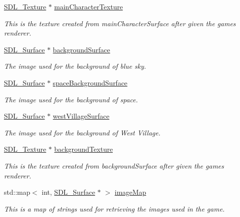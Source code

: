 \begin{DoxyCompactItemize}
\mbox{\hyperlink{_s_d_l__render_8h_a17850d7f1f5de457727cb3cf66b3a7f5}{S\+D\+L\+\_\+\+Texture}} $\ast$ \mbox{\hyperlink{class_resource_manager_a671fa64fc93e8fad27e25fdcfddbc982}{main\+Character\+Texture}}
\begin{DoxyCompactList}\small\item\em This is the texture created from main\+Character\+Surface after given the game\textquotesingle{}s renderer. \end{DoxyCompactList}\item 
\mbox{\hyperlink{struct_s_d_l___surface}{S\+D\+L\+\_\+\+Surface}} $\ast$ \mbox{\hyperlink{class_resource_manager_a824fd3c239a6ecca4b1cf770c73c1d3a}{background\+Surface}}
\begin{DoxyCompactList}\small\item\em The image used for the background of blue sky. \end{DoxyCompactList}\item 
\mbox{\hyperlink{struct_s_d_l___surface}{S\+D\+L\+\_\+\+Surface}} $\ast$ \mbox{\hyperlink{class_resource_manager_aa581160d976db2ad4cd19527a2111923}{space\+Background\+Surface}}
\begin{DoxyCompactList}\small\item\em The image used for the background of space. \end{DoxyCompactList}\item 
\mbox{\hyperlink{struct_s_d_l___surface}{S\+D\+L\+\_\+\+Surface}} $\ast$ \mbox{\hyperlink{class_resource_manager_ab31bfc864d9e4972909db9d0064c1835}{west\+Village\+Surface}}
\begin{DoxyCompactList}\small\item\em The image used for the background of West Village. \end{DoxyCompactList}\item 
\mbox{\hyperlink{_s_d_l__render_8h_a17850d7f1f5de457727cb3cf66b3a7f5}{S\+D\+L\+\_\+\+Texture}} $\ast$ \mbox{\hyperlink{class_resource_manager_ae8f8a6573b843ad8394bb44a8839bcc4}{background\+Texture}}
\begin{DoxyCompactList}\small\item\em This is the texture created from background\+Surface after given the game\textquotesingle{}s renderer. \end{DoxyCompactList}\item 
std\+::map$<$ int, \mbox{\hyperlink{struct_s_d_l___surface}{S\+D\+L\+\_\+\+Surface}} $\ast$ $>$ \mbox{\hyperlink{class_resource_manager_a9b85004d89011021ad4b35de520e22d3}{image\+Map}}
\begin{DoxyCompactList}\small\item\em This is a map of strings used for retrieving the images used in the game. \end{DoxyCompactList}\item 

\end{DoxyCompactItemize}
